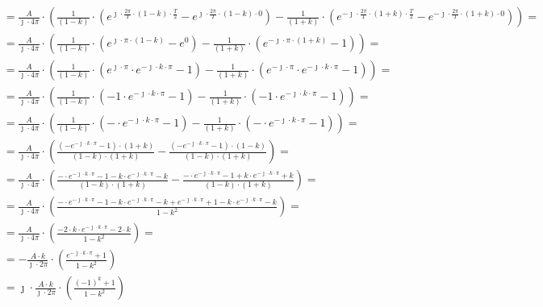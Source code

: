 \begin{task}
\begin{align*}
&=\frac{A}{\jmath \cdot 4\pi} \cdot \left( \frac{1}{\left(1 -k\right)} \cdot \left(e^{\jmath \cdot \frac{2\pi}{T} \cdot \left(1 -k\right) \cdot \frac{T}{2}} -e^{\jmath \cdot \frac{2\pi}{T} \cdot \left(1 -k\right) \cdot 0}\right) - \frac{1}{ \left(1+k\right)}\cdot \left( e^{-\jmath \cdot \frac{2\pi}{T} \cdot \left(1+k\right)\cdot \frac{T}{2} } - e^{-\jmath \cdot \frac{2\pi}{T} \cdot \left(1+k\right)\cdot 0 }\right) \right)=\\
&=\frac{A}{\jmath \cdot 4\pi} \cdot \left( \frac{1}{\left(1 -k\right)} \cdot \left(e^{\jmath \cdot \pi \cdot \left(1 -k\right) } -e^{0}\right) - \frac{1}{ \left(1+k\right)}\cdot \left( e^{-\jmath \cdot \pi \cdot \left(1+k\right) } - 1\right) \right)=\\
&=\frac{A}{\jmath \cdot 4\pi} \cdot \left( \frac{1}{\left(1 -k\right)} \cdot \left(e^{\jmath \cdot \pi } \cdot e^{-\jmath \cdot k \cdot \pi}  -1\right) - \frac{1}{ \left(1+k\right)}\cdot \left( e^{-\jmath \cdot \pi } \cdot e^{-\jmath \cdot k \cdot \pi } - 1\right) \right)=\\
&=\frac{A}{\jmath \cdot 4\pi} \cdot \left( \frac{1}{\left(1 -k\right)} \cdot \left(-1 \cdot e^{-\jmath \cdot k \cdot \pi}  -1\right) - \frac{1}{ \left(1+k\right)}\cdot \left( -1 \cdot e^{-\jmath \cdot k \cdot \pi } - 1\right) \right)=\\
&=\frac{A}{\jmath \cdot 4\pi} \cdot \left( \frac{1}{\left(1 -k\right)} \cdot \left(- \cdot e^{-\jmath \cdot k \cdot \pi}  -1\right) - \frac{1}{ \left(1+k\right)}\cdot \left( - \cdot e^{-\jmath \cdot k \cdot \pi } - 1\right) \right)=\\
&=\frac{A}{\jmath \cdot 4\pi} \cdot \left( \frac{\left(- e^{-\jmath \cdot k \cdot \pi}  -1\right) \cdot \left(1+k\right) }{\left(1 -k\right) \cdot \left(1+k\right)} - \frac{\left( - e^{-\jmath \cdot k \cdot \pi } - 1\right)  \cdot \left(1 -k\right)}{\left(1 -k\right) \cdot \left(1+k\right)} \right)=\\
&=\frac{A}{\jmath \cdot 4\pi} \cdot \left( \frac{- \cdot e^{-\jmath \cdot k \cdot \pi}  -1 - k \cdot e^{-\jmath \cdot k \cdot \pi}  -k }{\left(1 -k\right) \cdot \left(1+k\right)} - \frac{ - \cdot e^{-\jmath \cdot k \cdot \pi } - 1 +k \cdot e^{-\jmath \cdot k \cdot \pi } +k }{\left(1 -k\right) \cdot \left(1+k\right)} \right)=\\
&=\frac{A}{\jmath \cdot 4\pi} \cdot \left( \frac{- \cdot e^{-\jmath \cdot k \cdot \pi}  -1 - k \cdot e^{-\jmath \cdot k \cdot \pi}  -k + e^{-\jmath \cdot k \cdot \pi } + 1 -k \cdot e^{-\jmath \cdot k \cdot \pi } -k }{1 -k^2} \right)=\\
&=\frac{A}{\jmath \cdot 4\pi} \cdot \left( \frac{ - 2\cdot k \cdot e^{-\jmath \cdot k \cdot \pi}  -2\cdot k}{1 -k^2} \right)=\\
&=-\frac{A \cdot k}{\jmath \cdot 2\pi} \cdot \left( \frac{ e^{-\jmath \cdot k \cdot \pi}  + 1}{1 -k^2} \right)\\
&=\jmath \cdot \frac{A \cdot k}{\jmath \cdot 2\pi} \cdot \left( \frac{ (-1)^{k}  + 1}{1 -k^2} \right)
\end{align*}


\end{task}
